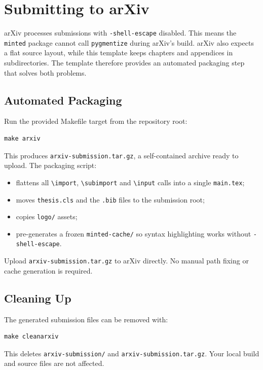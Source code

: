 \section{Submitting to arXiv}\label{ch5sec:arxiv}

arXiv processes submissions with \texttt{-shell-escape} disabled. This means the \texttt{minted} package cannot call \texttt{pygmentize} during arXiv's build. arXiv also expects a flat source layout, while this template keeps chapters and appendices in subdirectories. The template therefore provides an automated packaging step that solves both problems.

\begin{figure}[t]
\centering
{}
\label{ch5fig:architecture}
\end{figure}

\subsection{Automated Packaging}

Run the provided Makefile target from the repository root:

\begin{verbatim}
make arxiv
\end{verbatim}

This produces \texttt{arxiv-submission.tar.gz}, a self-contained archive ready to upload. The packaging script:

\begin{itemize}
\item flattens all \texttt{\textbackslash import}, \texttt{\textbackslash subimport} and \texttt{\textbackslash input} calls into a single \texttt{main.tex};
\item moves \texttt{thesis.cls} and the \texttt{.bib} files to the submission root;
\item copies \texttt{logo/} assets;
\item pre-generates a frozen \texttt{minted-cache/} so syntax highlighting works without \texttt{-shell-escape}.
\end{itemize}

Upload \texttt{arxiv-submission.tar.gz} to arXiv directly. No manual path fixing or cache generation is required.

\subsection{Cleaning Up}

The generated submission files can be removed with:

\begin{verbatim}
make cleanarxiv
\end{verbatim}

This deletes \texttt{arxiv-submission/} and \texttt{arxiv-submission.tar.gz}. Your local build and source files are not affected.
